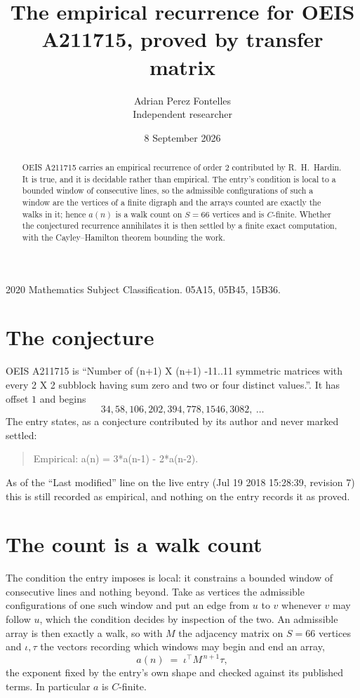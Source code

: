 \documentclass[11pt,a4paper]{article}
\title{The empirical recurrence for OEIS A211715, proved by transfer matrix}
\author{Adrian Perez Fontelles\\ \small Independent researcher}
\date{8 September 2026}
\theoremstyle{plain}
\theoremstyle{definition}
\begin{document}
\maketitle

\begin{abstract}
OEIS A211715 carries an empirical recurrence of order $2$ contributed by R.~H.~Hardin. It is
true, and it is decidable rather than empirical. The entry's condition is local to a bounded window of consecutive lines, so
the admissible configurations of such a window are the vertices of a finite digraph and the
arrays counted are exactly the walks in it; hence $a(n)$ is a walk count on $S=66$ vertices
and is $C$-finite. Whether the conjectured recurrence annihilates it is then settled by a
finite exact computation, with the Cayley--Hamilton theorem bounding the work.
\end{abstract}

\noindent\small 2020 Mathematics Subject Classification. 05A15, 05B45, 15B36.\normalsize

\section{The conjecture}

OEIS A211715 is ``Number of (n+1) X (n+1) -11..11 symmetric matrices with every 2 X 2 subblock having sum zero and two or four distinct values.''. It has offset $1$ and begins
\[
34, 58, 106, 202, 394, 778, 1546, 3082,\ \dots
\]
The entry states, as a conjecture contributed by its author and never marked settled:
\begin{quote}
Empirical: a(n) = 3*a(n-1) - 2*a(n-2).
\end{quote}
As of the ``Last modified'' line on the live entry (Jul 19 2018 15:28:39, revision 7) this is still
recorded as empirical, and nothing on the entry records it as proved.

\section{The count is a walk count}

The condition the entry imposes is local: it constrains a bounded window of consecutive lines and nothing beyond. Take as
vertices the admissible configurations of one such window and put an edge from $u$ to $v$
whenever $v$ may follow $u$, which the condition decides by inspection of the two. An
admissible array is then exactly a walk, so with $M$ the adjacency matrix on $S=66$ vertices
and $\iota,\tau$ the vectors recording which windows may begin and end an array,
\[
a(n)\;=\;\iota^{\!\top}M^{\,n+1}\tau ,
\]
the exponent fixed by the entry's own shape and checked against its published terms. In
particular $a$ is $C$-finite.
\end{document}
